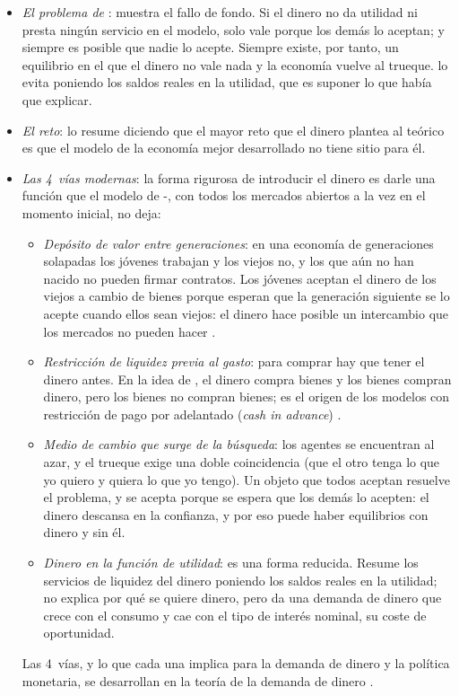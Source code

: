 \documentclass[11pt]{article}
\begin{document}
\begin{itemize}
\item \emph{El problema de }: \textcite{Hahn1965Problems} muestra el fallo de fondo. Si el dinero no da utilidad ni presta ningún servicio en el modelo, solo vale porque los demás lo aceptan; y siempre es posible que nadie lo acepte. Siempre existe, por tanto, un equilibrio en el que el dinero no vale nada y la economía vuelve al trueque.  lo evita poniendo los saldos reales en la utilidad, que es suponer lo que había que explicar.
\item \emph{El reto}: \textcite{Hahn1982Money} lo resume diciendo que el mayor reto que el dinero plantea al teórico es que el modelo de la economía mejor desarrollado no tiene sitio para él.
\item \emph{Las 4~vías modernas}: la forma rigurosa de introducir el dinero es darle una función que el modelo de -, con todos los mercados abiertos a la vez en el momento inicial, no deja:
  \begin{itemize}
  \item \emph{Depósito de valor entre generaciones}\nocite{Samuelson1958Exact}: en una economía de generaciones solapadas los jóvenes trabajan y los viejos no, y los que aún no han nacido no pueden firmar contratos. Los jóvenes aceptan el dinero de los viejos a cambio de bienes porque esperan que la generación siguiente se lo acepte cuando ellos sean viejos: el dinero hace posible un intercambio que los mercados no pueden hacer .
  \item \emph{Restricción de liquidez previa al gasto}\nocite{Clower1967Reconsideration}: para comprar hay que tener el dinero antes. En la idea de , el dinero compra bienes y los bienes compran dinero, pero los bienes no compran bienes; es el origen de los modelos con restricción de pago por adelantado (\emph{cash in advance}) .
  \item \emph{Medio de cambio que surge de la búsqueda}\nocite{KiyotakiWright1989Money}: los agentes se encuentran al azar, y el trueque exige una doble coincidencia (que el otro tenga lo que yo quiero y quiera lo que yo tengo). Un objeto que todos aceptan resuelve el problema, y se acepta porque se espera que los demás lo acepten: el dinero descansa en la confianza, y por eso puede haber equilibrios con dinero y sin él.
  \item \emph{Dinero en la función de utilidad}\nocite{Sidrauski1967Rational}: es una forma reducida. Resume los servicios de liquidez del dinero poniendo los saldos reales en la utilidad; no explica por qué se quiere dinero, pero da una demanda de dinero que crece con el consumo y cae con el tipo de interés nominal, su coste de oportunidad.
  \end{itemize}
  Las 4~vías, y lo que cada una implica para la demanda de dinero y la política monetaria, se desarrollan en la teoría de la demanda de dinero .
\end{itemize}
\end{document}

